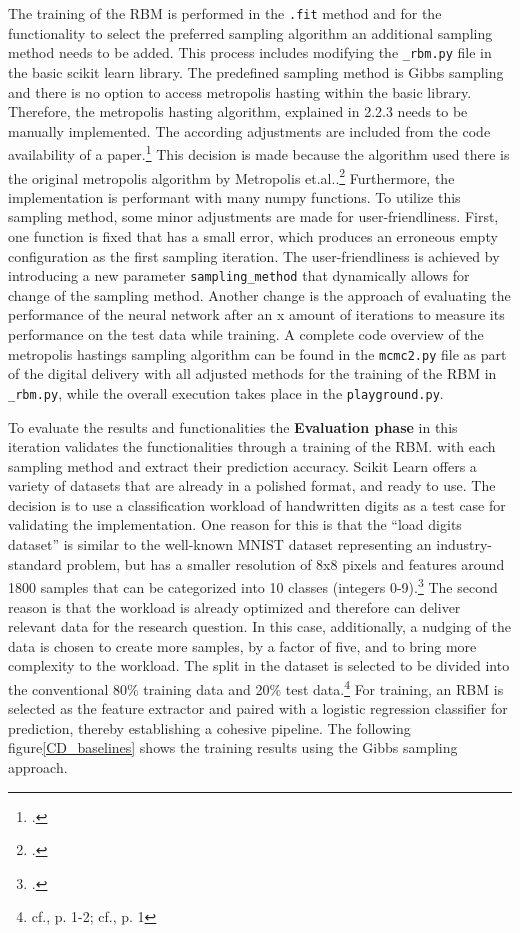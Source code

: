 The training of the \ac{RBM} is performed in the \texttt{.fit} method and for the functionality to select the preferred sampling algorithm an additional sampling method needs to be added.
This process includes modifying the \texttt{\_rbm.py} file in the basic scikit learn library.
The predefined sampling method is Gibbs sampling and there is no option to access metropolis hasting within the basic library. 
Therefore, the metropolis hasting algorithm, explained in 2.2.3 needs to be manually implemented.
The according adjustments are included from the code availability of a paper.\footcite[cf.][11-12]{bohmNoiseinjectedAnalogIsing2022}
This decision is made because the algorithm used there is the original metropolis algorithm by Metropolis et.al..\footcite[cf.][1087-1092]{metropolisEquationStateCalculations1953}
Furthermore, the implementation is performant with many numpy functions. 
To utilize this sampling method, some minor adjustments are made for user-friendliness. 
First, one function is fixed that has a small error, which produces an erroneous empty configuration as the first sampling iteration. 
The user-friendliness is achieved by introducing a new parameter \texttt{sampling\_method} that dynamically allows for change of the sampling method. 
Another change is the approach of evaluating the performance of the neural network after an x amount of iterations to measure its performance on the test data while training.
A complete code overview of the metropolis hastings sampling algorithm can be found in the \texttt{mcmc2.py} file as part of the digital delivery with all
adjusted methods for the training of the \ac{RBM} in \texttt{\_rbm.py}, while the overall execution takes place in the \texttt{playground.py}.

To evaluate the results and functionalities the \textbf{Evaluation phase} in this iteration validates the functionalities through a training of the \ac{RBM}. with each sampling method and extract their prediction accuracy.
Scikit Learn offers a variety of datasets that are already in a polished format, and ready to use. 
The decision is to use a classification workload of handwritten digits as a test case for validating the implementation.
One reason for this is that the ``load digits dataset'' is similar to the well-known MNIST dataset representing an industry-standard problem, but has a smaller resolution of 8x8 pixels and features around 1800 samples that can be categorized into 10 classes (integers 0-9).\footcite[cf.][1]{SklearnDatasetsLoad_digits}
The second reason is that the workload is already optimized and therefore can deliver relevant data for the research question.
In this case, additionally, a nudging of the data is chosen to create more samples, by a factor of five, and to bring more complexity to the workload. 
The split in the dataset is selected to be divided into the conventional 80\% training data and 20\% test data.\footnote{cf.\cite{charithaTypeIIDiabetesPrediction2022a}, p. 1-2; cf.\cite{supriAsianStockIndex2023}, p. 1}
For training, an \ac{RBM} is selected as the feature extractor and paired with a logistic regression classifier for prediction, thereby establishing a cohesive pipeline.
The following figure\ref{CD_baselines} shows the training results using the Gibbs sampling approach. 

